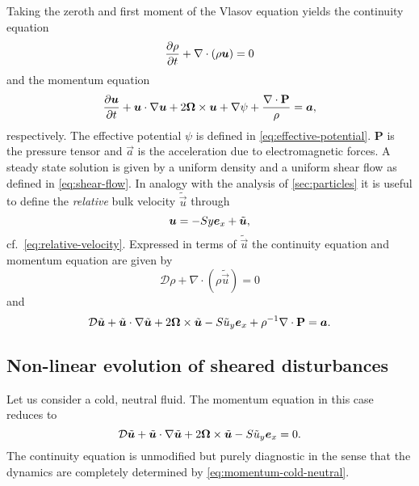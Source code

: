 \documentclass[aps,pre,notitlepage,amsmath,amssymb,amsfonts,nobibnotes,nofootinbib,superscriptaddress,onecolumn,a4paper,10pt]{revtex4-1}
\newcommand{\tvec}[1]{\tilde{\vec{#1}}}
\begin{document}
Taking the zeroth and first moment of the Vlasov equation yields the
continuity equation
\begin{equation}
  \frac{\partial\rho}{\partial t} + \nabla\cdot(\rho\bm{u}) = 0
\end{equation}
and the momentum equation
\begin{equation}
  \frac{\partial\bm{u}}{\partial t} + \bm{u}\cdot\nabla\bm{u}
  + 2\bm{\Omega}\times\bm{u} + \nabla\psi
  + \frac{\nabla\cdot\mathbf{P}}{\rho} = \bm{a},
\end{equation}
respectively. The effective potential $\psi$ is defined in
\cref{eq:effective-potential}. $\mathbf{P}$ is the pressure tensor and
$\vec{a}$ is the acceleration due to electromagnetic forces. A steady state
solution is given by a uniform density and a uniform shear flow as defined in
\cref{eq:shear-flow}. In analogy with the analysis of \cref{sec:particles} it
is useful to define the \emph{relative} bulk velocity $\tvec{u}$ through
\begin{equation}
  \vec{u} = -Sy\ex + \tvec{u},
\end{equation}
cf.~\cref{eq:relative-velocity}. Expressed in terms of $\tvec{u}$ the
continuity equation and momentum equation are given by
\begin{equation}
  \label{eq:continuity}
  \mathcal{D}\rho + \nabla\cdot(\rho\tvec{u}) = 0
\end{equation}
and
\begin{equation}
  \label{eq:momentum}
  \mathcal{D}\tvec{u} + \tvec{u}\cdot\nabla\tvec{u}
  + 2\vec{\Omega}\times\tvec{u} - S\tilde{u}_y\ex
  + \rho^{-1}\nabla\cdot\mathbf{P} = \vec{a}.
\end{equation}

\subsection{Non-linear evolution of sheared disturbances}

Let us consider a cold, neutral fluid. The momentum equation in this case
reduces to
\begin{equation}
  \label{eq:momentum-cold-neutral}
  \mathcal{D}\tvec{u} + \tvec{u}\cdot\nabla\tvec{u}
  + 2\vec{\Omega}\times\tvec{u} - S\tilde{u}_y\ex = 0.
\end{equation}
The continuity equation  is unmodified but purely
diagnostic in the sense that the dynamics are completely determined by
\cref{eq:momentum-cold-neutral}.
\end{document}
